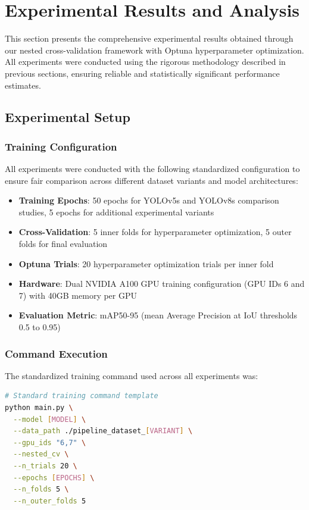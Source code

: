 \section{Experimental Results and Analysis}
This section presents the comprehensive experimental results obtained through our nested cross-validation framework with Optuna hyperparameter optimization. All experiments were conducted using the rigorous methodology described in previous sections, ensuring reliable and statistically significant performance estimates.

\subsection{Experimental Setup}

\subsubsection{Training Configuration}

All experiments were conducted with the following standardized configuration to ensure fair comparison across different dataset variants and model architectures:

\begin{itemize}
    \item \textbf{Training Epochs}: 50 epochs for YOLOv5s and YOLOv8s comparison studies, 5 epochs for additional experimental variants
    \item \textbf{Cross-Validation}: 5 inner folds for hyperparameter optimization, 5 outer folds for final evaluation
    \item \textbf{Optuna Trials}: 20 hyperparameter optimization trials per inner fold
    \item \textbf{Hardware}: Dual NVIDIA A100 GPU training configuration (GPU IDs 6 and 7) with 40GB memory per GPU
    \item \textbf{Evaluation Metric}: mAP50-95 (mean Average Precision at IoU thresholds 0.5 to 0.95)
\end{itemize}

\subsubsection{Command Execution}

The standardized training command used across all experiments was:

\begin{lstlisting}[language=bash]
# Standard training command template
python main.py \
  --model [MODEL] \
  --data_path ./pipeline_dataset_[VARIANT] \
  --gpu_ids "6,7" \
  --nested_cv \
  --n_trials 20 \
  --epochs [EPOCHS] \
  --n_folds 5 \
  --n_outer_folds 5
\end{lstlisting}

